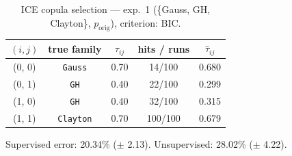 \begin{table}[htbp]
  \centering
  \caption{ICE copula selection — exp.\ 1 (\{Gauss, GH, Clayton\}, $p_{\text{orig}}$), criterion: BIC.}
  \label{tab:exp3-exp1_orig_p__bic}
  \begin{tabular}{ccccc}
    \toprule
    $(i, j)$ & true family & $\tau_{ij}$ & hits / runs & $\hat\tau_{ij}$ \\
    \midrule
    (0, 0) & \texttt{Gauss} & 0.70 & 14/100 & 0.680 \\
    (0, 1) & \texttt{GH} & 0.40 & 22/100 & 0.299 \\
    (1, 0) & \texttt{GH} & 0.40 & 32/100 & 0.315 \\
    (1, 1) & \texttt{Clayton} & 0.70 & 100/100 & 0.679 \\
    \bottomrule
  \end{tabular}
  \par\smallskip Supervised error: 20.34\% ($\pm$ 2.13). Unsupervised: 28.02\% ($\pm$ 4.22).
\end{table}

